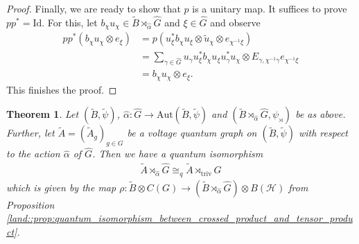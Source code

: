 \documentclass{amsart}
\newtheorem{thm}{Theorem}[section]
\theoremstyle{definition}
\theoremstyle{definition}
\begin{document}
\begin{proof}
    Finally, we are ready to show that $p$ is a unitary map. It suffices to prove $p p^\ast = \mathrm{Id}$. For this, let $b_\chi u_\chi \in \tilde{B} \rtimes_{\hat{\alpha}} \hat{G}$ and $\xi \in \hat{G}$ and observe
    \begin{align*}
        pp^\ast(b_\chi u_\chi \otimes e_\xi) 
            &= p\left( u_\xi^\ast b_\chi u_\xi \otimes \tilde{u}_\chi \otimes e_{\chi^{-1}\xi} \right) \\
            &=  \sum_{\gamma \in \hat{G}} u_\gamma u_\xi^\ast b_\chi u_\xi u_\gamma^\ast u_\chi \otimes E_{\gamma, \chi^{-1} \gamma} e_{\chi^{-1}\xi} \\
            &= b_\chi u_\chi \otimes e_\xi.
    \end{align*}
    This finishes the proof.
\end{proof}

\begin{thm}
    \label{qiso::thm:quantum_isomorphism_between_derived_graphs}
    Let $(\tilde{B}, \tilde{\psi})$, $\hat{\alpha}: \hat{G} \to \mathrm{Aut}(\tilde{B}, \tilde{\psi})$ and $(\tilde{B} \rtimes_{\hat{\alpha}} \hat{G}, \psi_\rtimes)$ be as above. Further, let $\tilde{A} = (\tilde{A}_g)_{g \in G}$ be a voltage quantum graph on $(\tilde{B}, \tilde{\psi})$ with respect to the action $\hat{\alpha}$ of $\hat{G}$.
    Then we have a quantum isomorphism
    \begin{align*}
        \tilde{A} \rtimes_{\hat{\alpha}} \hat{G} \cong_q \tilde{A} \rtimes_{\mathrm{triv}} G
    \end{align*}
    which is given by the map $\rho: \tilde{B} \otimes C(G) \to (\tilde{B} \rtimes_{\hat{\alpha}} \hat{G}) \otimes B(\mathcal{H})$ from Proposition \ref{land::prop:quantum_isomorphism_between_crossed_product_and_tensor_product}.
\end{thm}
\end{document}
